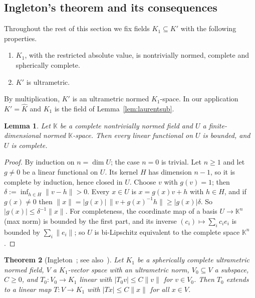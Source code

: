 \documentclass[11pt]{amsart}
\newtheorem{theorem}{Theorem}
\newtheorem{lemma}[theorem]{Lemma}
\theoremstyle{definition}
\theoremstyle{remark}
\numberwithin{equation}{section}
\newcommand{\Kh}{\widehat K}
\newcommand{\abs}[1]{\lvert #1\rvert}
\newcommand{\norm}[1]{\lVert #1\rVert}
\begin{document}
\subsection{Ingleton's theorem and its consequences}
Throughout the rest of this section we fix fields $K_1\subseteq K'$ with the following properties.
\begin{enumerate}
\item[(H1)] $K_1$, with the restricted absolute value, is nontrivially normed, complete and spherically complete.
\item[(H2)] $K'$ is ultrametric.
\end{enumerate}
By multiplication, $K'$ is an ultrametric normed $K_1$\nobreakdash-space. In our application $K'=\Kh$ and $K_1$ is the field of
Lemma~\ref{lem:laurentsub}.

\begin{lemma}\label{lem:findim}
Let $\mathbb K$ be a complete nontrivially normed field and $U$ a finite-dimensional normed $\mathbb K$\nobreakdash-space. Then every
linear functional on $U$ is bounded, and $U$ is complete.
\end{lemma}

\begin{proof}
By induction on $n=\dim U$; the case $n=0$ is trivial. Let $n\ge1$ and let $g\ne0$ be a linear functional on $U$. Its
kernel $H$ has dimension $n-1$, so it is complete by induction, hence closed in $U$. Choose $v$ with $g(v)=1$; then
$\delta:=\inf_{h\in H}\norm{v-h}>0$. Every $x\in U$ is $x=g(x)v+h$ with $h\in H$, and if $g(x)\ne0$ then
$\norm x=\abs{g(x)}\,\norm{v+g(x)^{-1}h}\ge\abs{g(x)}\delta$. So $\abs{g(x)}\le\delta^{-1}\norm x$. For completeness, the
coordinate map of a basis $U\to\mathbb K^n$ (max norm) is bounded by the first part, and its inverse
$(c_i)\mapsto\sum_ic_ie_i$ is bounded by $\sum_i\norm{e_i}$; so $U$ is bi-Lipschitz equivalent to the complete space
$\mathbb K^n$.
\end{proof}

\begin{theorem}[Ingleton~\cite{In}; see also~\cite{vR}]\label{thm:ingleton}
Let $K_1$ be a spherically complete ultrametric normed field, $V$ a $K_1$\nobreakdash-vector space with an ultrametric norm,
$V_0\subseteq V$ a subspace, $C\ge0$, and $T_0\colon V_0\to K_1$ linear with $\abs{T_0v}\le C\norm v$ for $v\in V_0$. Then
$T_0$ extends to a linear map $T\colon V\to K_1$ with $\abs{Tx}\le C\norm x$ for all $x\in V$.
\end{theorem}
\end{document}
